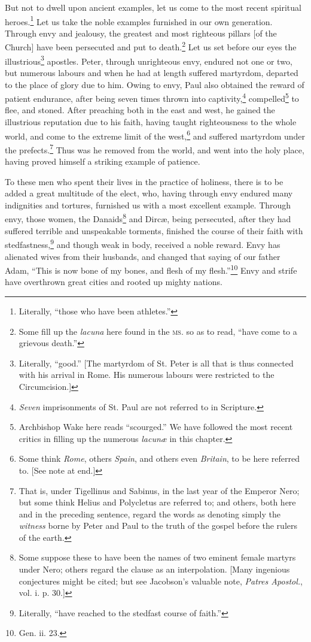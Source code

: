 But not to dwell upon ancient examples, let us come to the most recent spiritual heroes.\footnote{Literally, “those who have been athletes.”} Let us take the noble examples furnished in our own generation. Through envy and jealousy, the greatest and most righteous pillars [of the Church] have been persecuted and put to death.\footnote{Some fill up the \emph{lacuna} here found in the \textsc{ms.} so as to read, “have come to a grievous death.”} Let us set before our eyes the illustrious\footnote{Literally, “good.” [The martyrdom of St. Peter is all that is thus connected with his arrival in Rome. His numerous labours were restricted to the Circumcision.]} apostles. Peter, through unrighteous envy, endured not one or two, but numerous labours and when he had at length suffered martyrdom, departed to the place of glory due to him. Owing to envy, Paul also obtained the reward of patient endurance, after being seven times thrown into captivity,\footnote{\emph{Seven} imprisonments of St. Paul are not referred to in Scripture.} compelled\footnote{Archbishop Wake here reads “scourged.” We have followed the most recent critics in filling up the numerous \emph{lacunæ} in this chapter.} to flee, and stoned. After preaching both in the east and west, he gained the illustrious reputation due to his faith, having taught righteousness to the whole world, and come to the extreme limit of the west,\footnote{Some think \emph{Rome}, others \emph{Spain}, and others even \emph{Britain}, to be here referred to. [See note at end.]} and suffered martyrdom under the prefects.\footnote{That is, under Tigellinus and Sabinus, in the last year of the Emperor Nero; but some think Helius and Polycletus are referred to; and others, both here and in the preceding sentence, regard the words as denoting simply the \emph{witness} borne by Peter and Paul to the truth of the gospel before the rulers of the earth.} Thus was he removed from the world, and went into the holy place, having proved himself a striking example of patience.


To these men who spent their lives in the practice of holiness, there is to be added a great multitude of the elect, who, having through envy endured many indignities and tortures, furnished us with a most excellent example. Through envy, those women, the Danaids\footnote{Some suppose these to have been the names of two eminent female martyrs under Nero; others regard the clause as an interpolation. [Many ingenious conjectures might be cited; but see Jacobson’s valuable note, \emph{Patres Apostol.}, vol. i. p. 30.]} and Dircæ, being persecuted, after they had suffered terrible and unspeakable torments, finished the course of their faith with stedfastness,\footnote{Literally, “have reached to the stedfast course of faith.”} and though weak in body, received a noble reward. Envy has alienated wives from their husbands, and changed that saying of our father Adam, “This is now bone of my bones, and flesh of my flesh.”\footnote{Gen. ii. 23.} Envy and strife have overthrown great cities and rooted up mighty nations.


